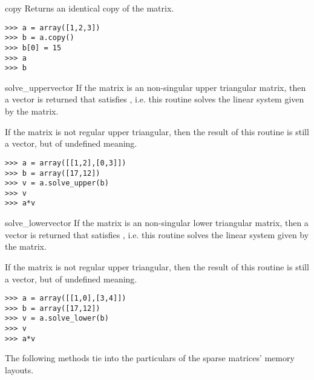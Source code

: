 \begin{methoddesc}{copy}{}
  Returns an identical copy of the matrix.
\begin{verbatim}
>>> a = array([1,2,3])
>>> b = a.copy()
>>> b[0] = 15
>>> a
>>> b
\end{verbatim}
\end{methoddesc}
\begin{methoddesc}{solve_upper}{vector}
  If the matrix is an non-singular upper triangular matrix, then a vector
   is returned that satisfies , i.e.
  this routine solves the linear system given by the matrix.

  If the matrix is not regular upper triangular, then the result of this routine
  is still a vector, but of undefined meaning.
\begin{verbatim}
>>> a = array([[1,2],[0,3]])
>>> b = array([17,12])
>>> v = a.solve_upper(b)
>>> v
>>> a*v
\end{verbatim}
\end{methoddesc}
\begin{methoddesc}{solve_lower}{vector}
  If the matrix is an non-singular lower triangular matrix, then a vector
   is returned that satisfies , i.e.
  this routine solves the linear system given by the matrix.

  If the matrix is not regular upper triangular, then the result of this routine
  is still a vector, but of undefined meaning.
  
\begin{verbatim}
>>> a = array([[1,0],[3,4]])
>>> b = array([17,12])
>>> v = a.solve_lower(b)
>>> v
>>> a*v
\end{verbatim}
\end{methoddesc}

The following methods tie into the particulars of the sparse matrices'
memory layouts.

